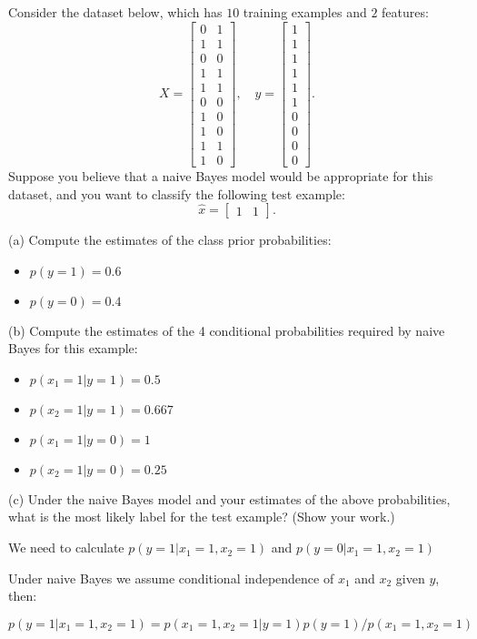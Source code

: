 \documentclass{article}
\def\blu#1{{\color{blu}#1}}
\def\items#1{\begin{itemize}#1\end{itemize}}
\begin{document}
Consider the dataset below, which has $10$ training examples and $2$ features:
\[
X = \begin{bmatrix}0 & 1\\1 & 1\\ 0 & 0\\ 1 & 1\\ 1 & 1\\ 0 & 0\\  1 & 0\\  1 & 0\\  1 & 1\\  1 &0\end{bmatrix}, \quad y = \begin{bmatrix}1\\1\\1\\1\\1\\1\\0\\0\\0\\0\end{bmatrix}.
\]
Suppose you believe that a naive Bayes model would be appropriate for this dataset, and you want to classify the following test example:
\[
\hat{x} = \begin{bmatrix}1 & 1\end{bmatrix}.
\]

\blu{(a) Compute the estimates of the class prior probabilities:}
\items{
\item$ p(y = 1)=0.6$
\item $p(y = 0)=0.4$
}

\blu{(b) Compute the estimates of the 4 conditional probabilities required by naive Bayes for this example:}
\items{
\item $p(x_1 = 1 | y = 1)=0.5$
\item $p(x_2 = 1 | y = 1)=0.667$
\item $p(x_1 = 1 | y = 0)=1$
\item $p(x_2 = 1 | y = 0)=0.25$
}

\blu{(c) Under the naive Bayes model and your estimates of the above probabilities, what is the most likely label for the test example? (Show your work.)}

We need to calculate $p(y=1|x_1=1, x_2=1)$ and $p(y=0|x_1=1, x_2=1)$

Under naive Bayes we assume conditional independence of $x_1$ and $x_2$ given $y$, then:

$p(y=1|x_1=1, x_2=1) = p(x_1=1, x_2=1|y=1)p(y=1)/p(x_1=1, x_2=1)$
\end{document}
